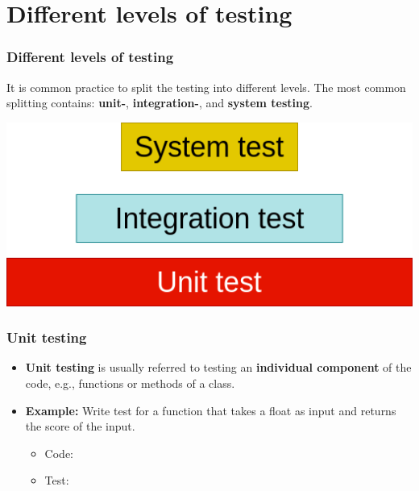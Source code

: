 \documentclass[9pt,xcolor=dvipsnames]{beamer}
\begin{document}
\section{Different levels of testing}
\begin{frame}
  \frametitle{Different levels of testing}
  It is common practice to split the testing into different
  levels. The most common splitting contains: \textbf{unit-}, \textbf{integration-}, and
  \textbf{system testing}.
  \vspace{1cm}
  \begin{center}
    \includegraphics[scale=0.3]{figs/levels.png}
  \end{center}
\end{frame}

\begin{frame}
  \frametitle{Unit testing}
  \begin{itemize}
    \item \textbf{Unit testing} is usually referred to testing an
      \textbf{individual component} of the code, e.g., functions or methods of a class.
    \item \textbf{Example:} Write test for a function that takes a float as
      input and returns the score of the input.
      \pause
      \begin{itemize} 
      \item Code:
        
        \pause
      \item Test:
        
      \end{itemize}
  \end{itemize}
\end{frame}
\end{document}
